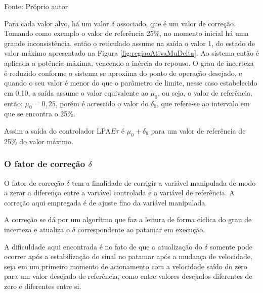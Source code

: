 \begin{table}[h]
\begin{tabular}{c|c|c||c}
\end{tabular}

{\vspace{0.2cm} \small Fonte: Próprio autor}
\end{table}


Para cada valor alvo, há um valor $\delta$ associado, 
que é um valor de correção.
Tomando como exemplo o valor de referência 25\%, 
no momento inicial há uma grande inconsistência,
então o reticulado assume na saída o valor 1, 
do estado de valor máximo apresentado na 
Figura \ref{fig:regiaoAtivaMuDelta}.
Ao sistema então é aplicada a potência máxima, 
vencendo a inércia do repouso.
O grau de incerteza é reduzido conforme 
o sistema se aproxima do ponto de operação desejado,
e quando o seu valor é menor do que 
o parâmetro de limite, nesse caso estabelecido em 0,10,
a saída assume o valor equivalente ao $\mu_0$, ou seja,
o valor de referência, então: $\mu_0 = 0,25$, porém 
é acrescido o valor do $\delta_9$, 
que refere-se ao intervalo em que se encontra o 25\%.

Assim a saída do controlador LPA$E\tau$ é 
$\mu_0 + \delta_9$
para um valor de referência de 25\% do valor máximo.









\subsubsection{O fator de correção $\delta$}

O fator de correção $\delta$ tem a finalidade de corrigir a variável
manipulada de modo a zerar a diferença entre a variável controlada e a
variável de referência. A correção aqui empregada é de ajuste fino da
variável manipulada.

A correção se dá por um algorítmo que faz a leitura de forma cíclica
do grau de incerteza e atualiza o $\delta$ correspondente ao patamar
em execução.

A dificuldade aqui encontrada é no fato de que a atualização do
$\delta$ somente pode ocorrer após a estabilização do sinal no patamar
após a mudança de velocidade, seja em um primeiro momento de
acionamento com a velocidade saído do zero para um valor desejado de
referência, como entre valores desejados diferentes de zero e
diferentes entre si. 

